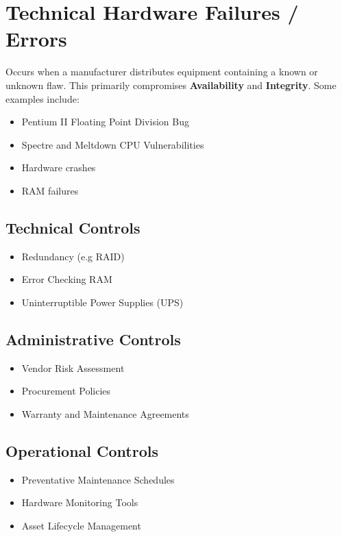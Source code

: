 \documentclass[12pt letter]{report}
\begin{document}
\section{Technical Hardware Failures / Errors}

Occurs when a manufacturer distributes equipment containing a known or unknown flaw. This primarily compromises \textbf{Availability} and \textbf{Integrity}. Some examples include:
\begin{itemize}
  \item Pentium II Floating Point Division Bug
  \item Spectre and Meltdown CPU Vulnerabilities
  \item Hardware crashes
  \item RAM failures
\end{itemize}

\subsection{Technical Controls}

\begin{itemize}
  \item Redundancy (e.g RAID)
  \item Error Checking RAM
  \item Uninterruptible Power Supplies (UPS)
\end{itemize}

\subsection{Administrative Controls}

\begin{itemize}
  \item Vendor Risk Assessment
  \item Procurement Policies
  \item Warranty and Maintenance Agreements
\end{itemize}

\subsection{Operational Controls}

\begin{itemize}
  \item Preventative Maintenance Schedules
  \item Hardware Monitoring Tools
  \item Asset Lifecycle Management
\end{itemize}
\end{document}
